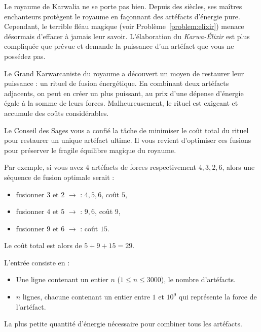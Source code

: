 \problemname{}


Le royaume de Karwalia ne se porte pas bien. Depuis des siècles, ses maîtres enchanteurs protègent le royaume en façonnant des artéfacts d'énergie pure. Cependant, le terrible fléau magique (voir Problème~\ref{problem:elixir}) menace désormais d'effacer à jamais leur savoir. L'élaboration du \emph{Karwa-Élixir} est plus compliquée que prévue et demande la puissance d'un artéfact que vous ne possédez pas.

Le Grand Karwarcaniste du royaume a découvert un moyen de restaurer leur puissance : un rituel de fusion énergétique. En combinant deux artéfacts adjacents, on peut en créer un plus puissant, au prix d'une dépense d'énergie égale à la somme de leurs forces. Malheureusement, le rituel est exigeant et accumule des coûts considérables.

Le Conseil des Sages vous a confié la tâche de minimiser le coût total du rituel pour restaurer un unique artéfact ultime. Il vous revient d'optimiser ces fusions pour préserver le fragile équilibre magique du royaume.

Par exemple, si vous avez $4$ artéfacts de forces respectivement $4, 3, 2, 6$, alors une séquence de fusion optimale serait :
\begin{itemize}
    \item fusionner $3$ et $2$ $\rightarrow$ : $4, 5, 6$, coût $5$,
    \item fusionner $4$ et $5$ $\rightarrow$ : $9, 6$, coût $9$,
    \item fusionner $9$ et $6$ $\rightarrow$ : coût $15$.
\end{itemize}
Le coût total est alors de $5 + 9 + 15 = 29$.

\begin{Input}
    L'entrée consiste en :
    \begin{itemize}
        \item Une ligne contenant un entier $n$ ($1 \leq n \leq 3000$), le nombre d'artéfacts.
        \item $n$ lignes, chacune contenant un entier entre $1$ et $10^{9}$ qui représente la force de l'artéfact.
    \end{itemize}
\end{Input}

\begin{Output}
    La plus petite quantité d'énergie nécessaire pour combiner tous les artéfacts.
\end{Output}
